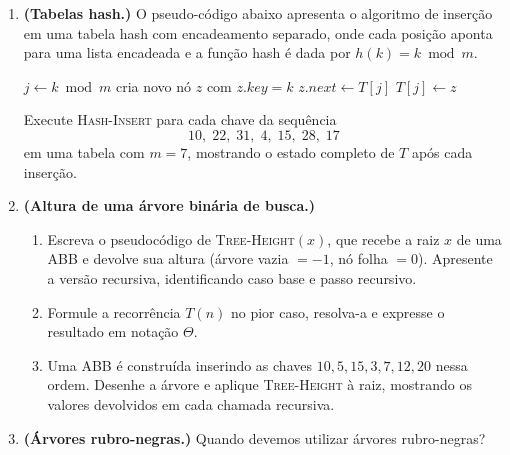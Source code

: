 \documentclass[9pt,a4paper]{extarticle}
\begin{document}
\begin{enumerate}[label=\textbf{\arabic*.}, leftmargin=*, itemsep=2em]
\item \textbf{(Tabelas hash.)} O pseudo-código abaixo apresenta o algoritmo de inserção em uma tabela hash com encadeamento separado, onde cada posição aponta para uma lista encadeada e a função hash é dada por \(h(k) = k \bmod m\).

  \begin{algorithmic}[1]
    \State $j \gets k \bmod m$
    \State cria novo nó $z$ com $z.\mathit{key} = k$
    \State $z.\mathit{next} \gets T[j]$
    \State $T[j] \gets z$
  \EndProcedure
\end{algorithmic}

  Execute \textsc{Hash-Insert} para cada chave da sequência
  \[
    10,\; 22,\; 31,\; 4,\; 15,\; 28,\; 17
  \]
  em uma tabela com \(m = 7\), mostrando o estado completo de \(T\) após cada inserção.

\item \textbf{(Altura de uma árvore binária de busca.)}

  \begin{enumerate}[label=(\alph*)]
    \item Escreva o pseudocódigo de \textsc{Tree-Height}$(x)$, que recebe a raiz
          \(x\) de uma ABB e devolve sua altura (árvore vazia $= -1$, nó folha $= 0$).
          Apresente a versão recursiva, identificando caso base e passo recursivo.
    \item Formule a recorrência \(T(n)\) no pior caso, resolva-a e expresse o
          resultado em notação \(\Theta\).
    \item Uma ABB é construída inserindo as chaves \(10, 5, 15, 3, 7, 12, 20\)
          nessa ordem. Desenhe a árvore e aplique \textsc{Tree-Height} à raiz,
          mostrando os valores devolvidos em cada chamada recursiva.
  \end{enumerate}

\item \textbf{(Árvores rubro-negras.)}
  Quando devemos utilizar árvores rubro-negras? 
\end{enumerate}
\end{document}
